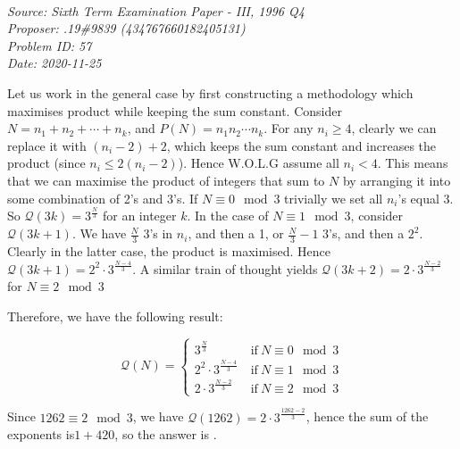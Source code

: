 \SSbreak\\
\emph{Source: Sixth Term Examination Paper - III, 1996 Q4}\\
\emph{Proposer: .19\#9839 (434767660182405131)}\\
\emph{Problem ID: 57}\\
\emph{Date: 2020-11-25}\\
\SSbreak

\bigskip

\begin{solution}\hfil\medskip

    Let us work in the general case by first constructing a methodology which maximises product while keeping the sum constant. Consider \(N=n_1+n_2+\cdots+n_k\), and \(P(N)=n_1n_2\cdots n_k\). For any \(n_i\geq 4\), clearly we can replace it with \((n_i-2)+2\), which keeps the sum constant and increases the product (since \(n_i\leq 2(n_i-2)\)). Hence W.O.L.G assume all \(n_i<4\). This means that we can maximise the product of integers that sum to \(N\) by arranging it into some combination of 2's and 3's. If \(N\equiv0\mod{3}\) trivially we set all \(n_i\)'s equal 3. So \(\mathcal{Q}(3k)=3^{\frac{N}{3}}\) for an integer \(k\). In the case of \(N\equiv 1\mod{3}\), consider\(\mathcal{Q}(3k+1)\). We have \(\frac{N}{3}\) 3's in \(n_i\), and then a 1, or \(\frac{N}{3}-1\) 3's, and then a \(2^2\). Clearly in the latter case, the product is maximised. Hence \(\mathcal{Q}(3k+1)=2^2\cdot3^{\frac{N-4}{3}}\). A similar train of thought yields \(\mathcal{Q}(3k+2)=2\cdot3^{\frac{N-2}{3}}\) for \(N\equiv 2\mod{3}\)\medskip
    
    Therefore, we have the following result:
    
    \begin{equation*}
        \mathcal{Q}(N)=
        \begin{cases}
            3^{\frac{N}{3}}\ &\mathrm{if}\ N \equiv 0 \mod 3\\
            2^2\cdot3^{\frac{N-4}{3}}\ &\mathrm{if}\ N \equiv 1 \mod 3\\
            2\cdot3^{\frac{N-2}{3}}\ &\mathrm{if}\ N \equiv 2 \mod 3
        \end{cases}
    \end{equation*}
    
    Since \(1262\equiv 2\mod 3\), we have \(\mathcal{Q}(1262)=2\cdot3^{\frac{1262-2}{3}}\), hence the sum of the exponents is\(1+420\), so the answer is .
\end{solution}\bigskip